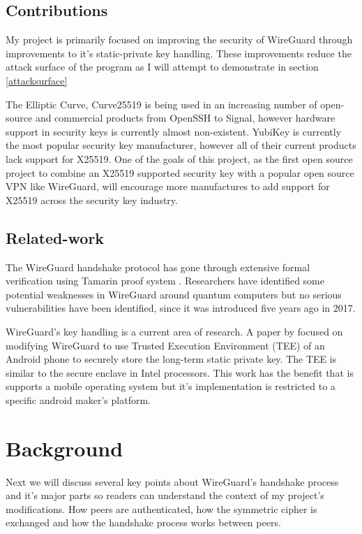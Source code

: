 \documentclass [11pt, proquest] {uwthesis}[2020/02/24]
\begin{document}
\section {Contributions}
My project is primarily focused on improving the security of WireGuard through improvements to it's static-private key handling. These improvements reduce the attack surface of the program as I will attempt to demonstrate in section \ref{attacksurface}

The Elliptic Curve, Curve25519 is being used in an increasing number of open-source and commercial products from OpenSSH to Signal\cite{ianix_things_2022}, however hardware support in 
security keys is currently almost non-existent. YubiKey is currently the most popular security key manufacturer, however all of their current products lack support for X25519. One of the goals of this project, as the first open source project to combine an X25519 supported security key with a popular open source VPN like WireGuard, will encourage more manufactures to add support for X25519 across the security key industry.

\section {Related-work}
\label{related_work}
The WireGuard handshake protocol has gone through extensive formal verification using Tamarin proof system \cite{donenfeld_formal_2018}. Researchers have identified some potential weaknesses in WireGuard around quantum computers\cite{hulsing_post-quantum_2021} but no serious vulnerabilities have been identified, since it was introduced five years ago in 2017.

WireGuard's key handling is a current area of research. A paper by \cite{wu_sewg_2020} focused on modifying WireGuard to use Trusted Execution Environment (TEE) of an Android phone to securely store the long-term static private key. The TEE is similar to the secure enclave in Intel processors. This work has the benefit that is supports a mobile operating system but it's implementation is restricted to a specific android maker's platform.


\chapter {Background}
\label{background}
Next we will discuss several key points about WireGuard's handshake process and it's major parts so readers can understand the context of my project's modifications. How peers are authenticated, how the symmetric cipher is exchanged and how the handshake process works between peers.
\end{document}
